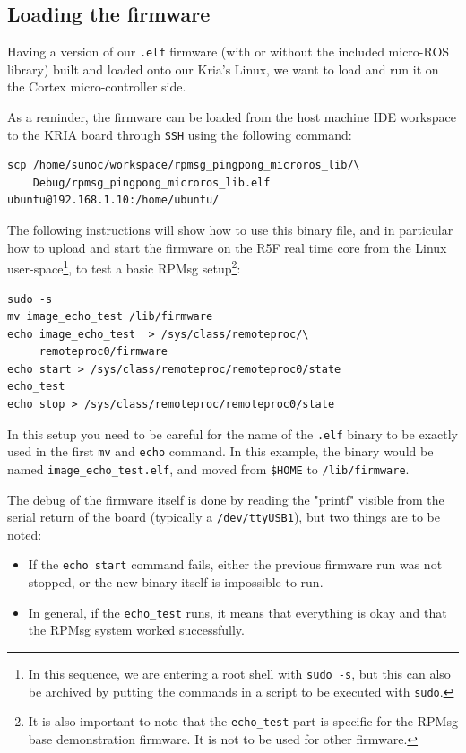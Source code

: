 \documentclass[10pt]{article}
\begin{document}
\clearpage
\subsection{Loading the firmware}
\label{sec:orgfd36186}
Having a version of our \texttt{.elf} firmware (with or without the included
micro-ROS library) built and loaded onto our Kria's Linux, we want to load and run it
on the Cortex micro-controller side.

As a reminder, the firmware can be loaded from the host machine IDE workspace
to the KRIA board through \texttt{SSH} using the following command:
\begin{verbatim}
scp /home/sunoc/workspace/rpmsg_pingpong_microros_lib/\
    Debug/rpmsg_pingpong_microros_lib.elf  ubuntu@192.168.1.10:/home/ubuntu/
\end{verbatim}

The following instructions will show how to use this binary file, and
in particular how to upload and start the firmware on the R5F real time core
from the Linux user-space\footnote{In this sequence, we are entering a root shell with \texttt{sudo -s}, but this can
also be archived by putting the commands in a script to be executed with \texttt{sudo}.}, to test a basic RPMsg setup\footnote{It is also important to note that the \texttt{echo\_test} part is specific for the
RPMsg base demonstration firmware. It is not to be used for other firmware.}:
\begin{verbatim}
sudo -s
mv image_echo_test /lib/firmware
echo image_echo_test  > /sys/class/remoteproc/\
     remoteproc0/firmware
echo start > /sys/class/remoteproc/remoteproc0/state
echo_test
echo stop > /sys/class/remoteproc/remoteproc0/state
\end{verbatim}

In this setup you need to be careful for the name of the \texttt{.elf} binary to be exactly used
in the first \texttt{mv} and \texttt{echo} command. In this example, the binary would be named
\texttt{image\_echo\_test.elf}, and moved from \texttt{\$HOME} to \texttt{/lib/firmware}.

The debug of the firmware itself is done by reading the "printf" visible from the serial
return of the board (typically a \texttt{/dev/ttyUSB1}), but two things are to be noted:
\begin{itemize}
\item If the \texttt{echo start} command fails, either the previous firmware run was not stopped,
or the new binary itself is impossible to run.
\item In general, if the \texttt{echo\_test} runs, it means that everything is okay and that
the RPMsg system worked successfully.
\end{itemize}
\end{document}
